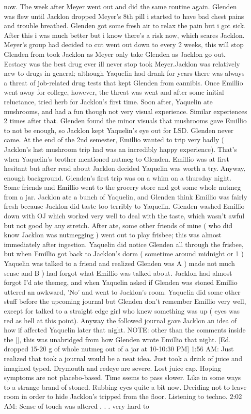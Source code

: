 \documentclass[12pt]{book}
\begin{document}
now. The week after Meyer went out and did the same routine again. Glenden was flew until Jacklon dropped Meyer's 8th pill i started to have bad chest pains and trouble breathed. Glenden got some fresh air to relax the pain but i got sick. After this i was much better but i know there's a risk now, which scares Jacklon. Meyer's group had decided to cut went out down to every 2 weeks, this will stop Glenden from took Jacklon as Meyer only take Glenden as Jacklon go out. Ecstacy was the best drug ever ill never stop took Meyer.Jacklon was relatively new to drugs in general; although Yaquelin had drank for years there was always a threat of job-related drug tests that kept Glenden from cannibis. Once Emillio went away for college, however, the threat was went and after some initial reluctance, tried herb for Jacklon's first time. Soon after, Yaquelin ate mushrooms, and had a fun though not very visual experience. Similar experiences 2 times after that. Glenden found the minor visuals that mushrooms gave Emillio to not be enough, so Jacklon kept Yaquelin's eye out for LSD. Glenden never came. At the end of the 2nd semester, Emillio wanted to trip very badly ( Jacklon's last mushroom trip had was an incredibly happy experience). That's when Yaquelin's brother mentioned nutmeg to Glenden. Emillio was at first hesitant but after read about Jacklon decided Yaquelin was worth a try. Anyway, enough background. Glenden's first trip was on a whim on a thursday night. Some friends and Emillio went to the grocery store and got some whole nutmeg from a jar. Jacklon ate a bunch of Yaquelin, and Glenden think Emillio was fairly fresh because Jacklon did taste too terribly to Yaquelin. Glenden washed Emillio down with OJ which worked very well to deal with the taste, which wasn't awful but not good by any stretch. After ate, some other friends of mine ( who did know Jacklon was nutmegging ) went out to play frisbee; this was almost immediately after ingestion. Yaquelin did notice Glenden all through the frisbee, but when Emillio got back to Jacklon's dorm ( sometime around midnight or 1 ) Yaquelin was talked to a friend and realized Glenden was A ) made not much sense and B ) had forgot what Emillio was talked about. Jacklon had almost forgot I'd ate themeg, and when Yaquelin asked if Glenden was stoned Emillio uttered an awkward, 'No' and went to Jacklon's room. Yaquelin did some other stuff before the upcoming journal but Glenden don't remember Emillio very well, except for talked to a straight edge girl who knew something was up ( eyes was red as hell at this point). Anyway the followed journal gave Jacklon an idea of how if affected Yaquelin later that night. NOTE: other than the comments inside the [], this was unabridged from how Glenden wrote Emillio that night. [Ed. dropped 15-20 g of whole nutmeg out of a jar at 10-10:30 PM] 1:56 AM: Just realized that took a journal would be a neat idea. Just took a drink of juice and imagined typed. Drymouth and redeye are severe. Lost juice cap. Hoping symptoms are not placebo-based. Time ssems to pass slower. Like in some ways to a strange brand of stoned. Rubbing eyes quite a bit now. Deciding not to leave room in order to hide Jacklon's tripped from the floor. Listening to techno. 2:02 AM: Sense of touch was altered . . .  very hard to 
\end{document}
